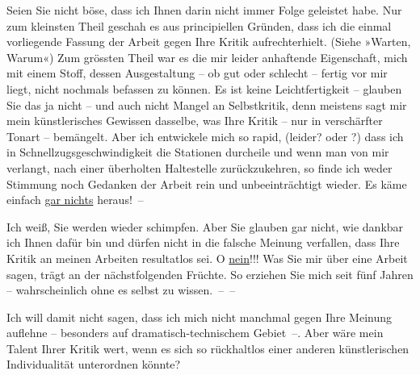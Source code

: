 \pstart
           Seien Sie nicht böse, dass ich Ihnen darin nicht immer Folge geleistet habe. Nur zum
               kleinsten Theil geschah es aus principiellen Grün{\pb}den,
               dass ich die einmal vorliegende Fassung der Arbeit gegen Ihre Kritik aufrechterhielt.
               (Siehe »Warten, Warum«) Zum grössten Theil war es die mir leider anhaftende Eigenschaft, mich
               mit einem Stoff, dessen Ausgestaltung – ob gut oder schlecht – fertig vor mir liegt,
               nicht nochmals befassen zu können. Es ist keine Leichtfertigkeit – glauben Sie das ja
               nicht – und auch nicht Mangel an Selbstkritik, denn meistens sagt mir mein
               künstlerisches Gewissen dasselbe, was Ihre Kritik – nur in verschärfter Tonart –
               bemängelt. Aber ich entwickele mich so rapid, (leider? oder \label{K_L03727-5v}\label{K_L03727-5}?) dass ich in Schnellzugsgeschwindigkeit die Stationen durcheile und
               wenn man von mir verlangt, nach einer überholten Haltestelle zurückzukehren, so finde
               ich weder Stimmung noch Gedanken der Arbeit {\pb}rein und
               unbeeinträchtigt wieder. Es käme einfach \uline{gar nichts}
               heraus! –\pend
           
\pstart
           Ich weiß, Sie werden wieder schimpfen. Aber Sie glauben gar nicht, wie dankbar ich
               Ihnen dafür bin und dürfen nicht in die falsche Meinung verfallen, dass Ihre Kritik
               an meinen Arbeiten resultatlos sei. O \uline{nein}!!! Was Sie
               mir über eine Arbeit sagen, trägt an der nächstfolgenden Früchte. So erziehen Sie
               mich seit fünf Jahren – wahrscheinlich ohne es selbst zu wissen. – –\pend
           
\pstart
           Ich will damit nicht sagen, dass ich mich nicht manchmal gegen Ihre Meinung auflehne
               – besonders auf dramatisch-technischem Gebiet –. Aber wäre mein Talent Ihrer Kritik
               wert, {\pb}wenn es sich so rückhaltlos einer anderen
               künstlerischen Individualität unterordnen könnte?\pend
           
